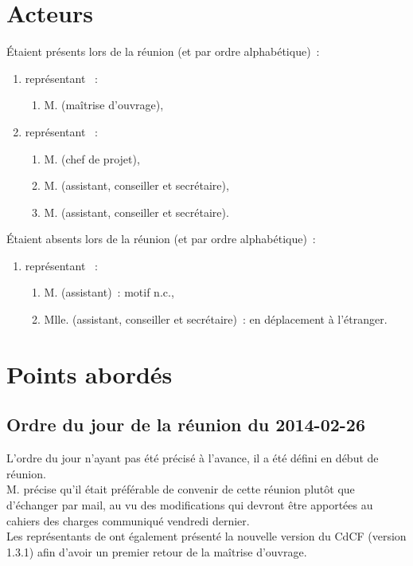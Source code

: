 \documentclass[11pt,fleqn]{report}
\begin{document}
\section{Acteurs}
Étaient présents lors de la réunion (et par ordre alphabétique)~:
\begin{enumerate}
	\item représentant \mo~:
	\begin{enumerate}
		\item M. \Agopian (maîtrise d'ouvrage),
	\end{enumerate}
	\item représentant \amo~:
	\begin{enumerate}
		\item M. \Cadon (chef de projet),
		\item M. \Gairoard (assistant, conseiller et secrétaire),
		\item M. \Pachy (assistant, conseiller et secrétaire).
	\end{enumerate}
\end{enumerate}
Étaient absents lors de la réunion (et par ordre alphabétique)~:
\begin{enumerate}
	\item représentant \amo~:
	\begin{enumerate}
		\item M. \Balde (assistant)~: motif n.c.,
		\item Mlle. \Toure (assistant, conseiller et secrétaire)~: en déplacement à l'étranger.
	\end{enumerate}
\end{enumerate}

\section{Points abordés}

\subsection{Ordre du jour de la réunion du 2014-02-26}
L'ordre du jour n'ayant pas été précisé à l'avance, il a été défini en début de réunion.
\\
M. \Agopian précise qu'il était préférable de convenir de cette réunion plutôt que d'échanger par mail, au vu des modifications qui devront être apportées au cahiers des charges communiqué vendredi dernier.
\\
Les représentants de \amo ont également présenté la nouvelle version du CdCF (version 1.3.1) afin d'avoir un premier retour de la maîtrise d'ouvrage.
\end{document}
